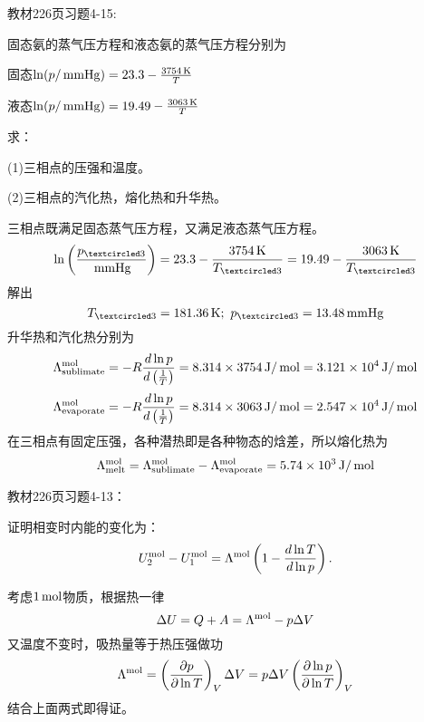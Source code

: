 \documentclass[CJK]{beamer}
\begin{document}
\begin{frame}
  \chtitle{\proid (\stwo)}
  \bch
  教材226页习题4-15:

  固态氨的蒸气压方程和液态氨的蒸气压方程分别为
  
  固态$\ln(p/\,\mathrm{mmHg}) = 23.3 - \frac{3754\,\mathrm{K}}{T}$

  液态$\ln(p/\,\mathrm{mmHg}) = 19.49 -\frac{3063\,\mathrm{K}}{T}$

  求：

  (1)三相点的压强和温度。

  (2)三相点的汽化热，熔化热和升华热。
  \ech
\end{frame}


\begin{frame}
  \bch
      {\small
        三相点既满足固态蒸气压方程，又满足液态蒸气压方程。
        $$\ln\left(\frac{\pthree}{\SImmHg}\right) = 23.3-\frac{3754\SIK}{\Tthree} = 19.49 - \frac{3063 \SIK}{\Tthree}$$
        解出
        $$\Tthree = 181.36\SIK;\ \pthree = 13.48\SImmHg$$
        升华热和汽化热分别为
        $$\Lambda^{\rm mol}_{\rm sublimate} = - R\frac{d\ln p}{d\left(\frac{1}{T}\right)} =8.314\times 3754\,\mathrm{J}/\,\mathrm{mol} = 3.121\times 10^4 \,\mathrm{J}/\,\mathrm{mol} $$
        $$\Lambda^{\rm mol}_{\rm evaporate} = -R \frac{d\ln p}{d\left(\frac{1}{T}\right)} = 8.314\times 3063\,\mathrm{J}/\,\mathrm{mol} = 2.547\times 10^4 \,\mathrm{J}/\,\mathrm{mol} $$
        在三相点有固定压强，各种潜热即是各种物态的焓差，所以熔化热为
        $$\Lambda^{\rm mol}_{\rm melt} = \Lambda^{\rm mol}_{\rm sublimate} - \Lambda^{\rm mol}_{\rm evaporate} = 5.74 \times 10^3 \,\mathrm{J}/\,\mathrm{mol}$$
        
      }
  \ech
\end{frame}

\begin{frame}
  \chtitle{\proid (\stwo)}
  \bch
  教材226页习题4-13：

  证明相变时内能的变化为：
  $$U_2^{\rm mol}-U^{\rm mol}_1 = \Lambda^{\rm mol}\left(1-\frac{d\ln T}{d\ln p}\right).$$
  \ech
\end{frame}


\begin{frame}
  \bch
      {\small
        考虑$1\,\mathrm{mol}$物质，根据热一律
        $$ \Delta U = Q + A = \Lambda^{\rm mol} - p \Delta V$$
        又温度不变时，吸热量等于热压强做功
        $$\Lambda^{\rm mol} = \left(\frac{\partial p}{\partial \ln T}\right)_{V} \Delta V = p\Delta V \left(\frac{\partial \ln p}{\partial \ln T}\right)_{V} $$
        结合上面两式即得证。
      }
  \ech
\end{frame}
\end{document}
